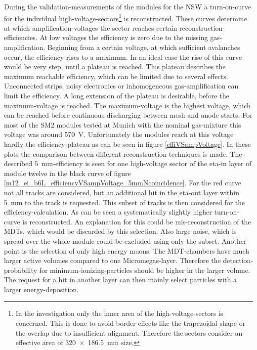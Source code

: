 \documentclass[
twoside,            %
BCOR1.4cm,          %
10pt,               %
headings=normal,    %
headsepline,        %
clearplainpage,		%
final,              %
div=14,
open=right,
bibliography=toc
]{scrreprt}
\begin{document}
During the validation-measurements of the modules for the NSW a turn-on-curve for the individual high-voltage-sectors\footnote{
	In the investigation only the inner area of the high-voltage-sectors is concerned.
	This is done to avoid border effects like the trapezoidal-shape or the overlap due to insufficient alignment.
	Therefore the sectors consider an effective area of \SI[product-units = repeat]{320 x 186.5}{mm} size. 
} is reconstructed.
These curves determine at which amplification-voltages the sector reaches certain reconstruction-efficiencies.
At low voltages the efficiency is zero due to the missing gas-amplification.
Beginning from a certain voltage, at which sufficient avalanches occur, the efficiency rises to a maximum.
In an ideal case the rise of this curve would be very step, until a plateau is reached.
This plateau describes the maximum reachable efficiency, which can be limited due to several effects.
Unconnected strips, noisy electronics or inhomogeneous gas-amplification can limit the efficiency.
A long extension of the plateau is desirable, before the maximum-voltage is reached.
The maximum-voltage is the highest voltage, which can be reached before continuous discharging between mesh and anode starts. 
For most of the SM2 modules tested at Munich with the nominal gas-mixture this voltage was around \SI{570}{V}.
Unfortunately the modules reach at this voltage hardly the efficiency-plateau as can be seen in figure \ref{effiVSampVoltage}.
In these plots the comparison between different reconstruction techniques is made.
The described \SI{5}{mm}-efficiency is seen for one high-voltage sector of the eta-in layer of module twelve in the black curve of figure \ref{m12_ei_b6L_efficiencyVSampVoltage_5mmNcoincidence}.
For the red curve not all tracks are considered, but an additional hit in the eta-out layer within \SI{5}{mm} to the track is requested.
This subset of tracks is then considered for the efficiency-calculation.
As can be seen a systematically slightly higher turn-on-curve is reconstructed.
An explanation for this could be mis-reconstruction of the MDTs, which would be discarded by this selection.
Also large noise, which is spread over the whole module could be excluded using only the subset.
Another point is the selection of only high energy muons.
The MDT-chambers have much larger active volumes compared to one Micromegas-layer.
Therefore the detection-probability for minimum-ionizing-particles should be higher in the larger volume.
The request for a hit in another layer can then mainly select particles with a larger energy-deposition.
\end{document}
